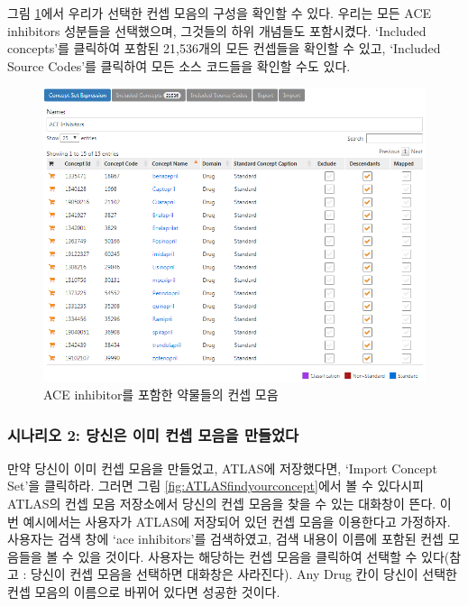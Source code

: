 \documentclass[11pt]{book}
\theoremstyle{definition}
\theoremstyle{definition}
\theoremstyle{definition}
\theoremstyle{remark}
\begin{document}
그림 \ref{fig:aceConceptSetExpression}에서 우리가 선택한 컨셉 모음의
구성을 확인할 수 있다. 우리는 모든 ACE inhibitors 성분들을 선택했으며,
그것들의 하위 개념들도 포함시켰다. `Included concepts'를 클릭하여 포함된
21,536개의 모든 컨셉들을 확인할 수 있고, `Included Source Codes'를
클릭하여 모든 소스 코드들을 확인할 수도 있다.

\begin{figure}

{\centering \includegraphics[width=1\linewidth]{images/Cohorts/aceConceptSetExpression} 

}

\caption{ACE inhibitor를 포함한 약물들의 컨셉 모음}\label{fig:aceConceptSetExpression}
\end{figure}

\subsubsection*{시나리오 2: 당신은 이미 컨셉 모음을
만들었다}\label{-2-----}

만약 당신이 이미 컨셉 모음을 만들었고, ATLAS에 저장했다면, `Import
Concept Set'을 클릭하라. 그러면 그림 \ref{fig:ATLASfindyourconcept}에서
볼 수 있다시피 ATLAS의 컨셉 모음 저장소에서 당신의 컨셉 모음을 찾을 수
있는 대화창이 뜬다. 이번 예시에서는 사용자가 ATLAS에 저장되어 있던 컨셉
모음을 이용한다고 가정하자. 사용자는 검색 창에 `ace inhibitors'를
검색하였고, 검색 내용이 이름에 포함된 컨셉 모음들을 볼 수 있을 것이다.
사용자는 해당하는 컨셉 모음을 클릭하여 선택할 수 있다(참고 : 당신이 컨셉
모음을 선택하면 대화창은 사라진다). Any Drug 칸이 당신이 선택한 컨셉
모음의 이름으로 바뀌어 있다면 성공한 것이다.
\end{document}
